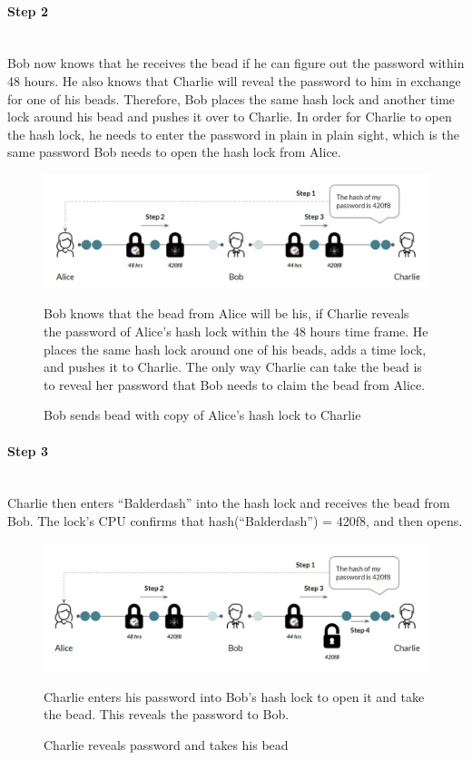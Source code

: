 \documentclass[a4paper, 12pt]{report}
\begin{document}
\paragraph{Step 2} \hspace{0pt} \\
Bob now knows that he receives the bead if he can figure out the password within 48 hours. He also knows that Charlie will reveal the password to him in exchange for one of his beads. Therefore, Bob places the same hash lock and another time lock around his bead and pushes it over to Charlie. In order for Charlie to open the hash lock, he needs to enter the password in plain in plain sight, which is the same password Bob needs to open the hash lock from Alice.

\begin{figure}[H]
	\includegraphics[width=\textwidth]{10_HTLC_Step2}
	\caption{Bob sends bead with copy of Alice's hash lock to Charlie}
	\medskip
	\small Bob knows that the bead from Alice will be his, if Charlie reveals the password of Alice's hash lock within the 48 hours time frame. He places the same hash lock around one of his beads, adds a time lock, and pushes it to Charlie. The only way Charlie can take the bead is to reveal her password that Bob needs to claim the bead from Alice.
	\label{fig:10_HTLC_Step2}
\end{figure} 

\paragraph{Step 3} \hspace{0pt} \\
Charlie then enters “Balderdash” into the hash lock and receives the bead from Bob. The lock’s CPU confirms that hash(“Balderdash”) = 420f8, and then opens.

\begin{figure}[H]
	\includegraphics[width=\textwidth]{11_HTLC_Step3}
	\caption{Charlie reveals password and takes his bead}
	\medskip
	\small Charlie enters his password into Bob's hash lock to open it and take the bead. This reveals the password to Bob.
	\label{fig:11_HTLC_Step3}
\end{figure} 
\end{document}
